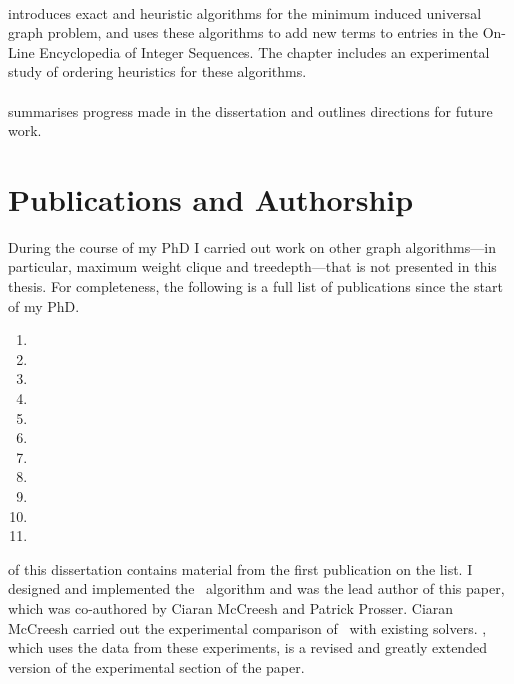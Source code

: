 \paragraph*{} introduces exact and heuristic
algorithms for the minimum induced universal graph problem, and uses these
algorithms to add new terms to entries in
the On-Line Encyclopedia of Integer Sequences.  The chapter includes
an experimental study of ordering heuristics for these algorithms.

\paragraph*{} summarises progress made in the dissertation
and outlines directions for future work.

\section{Publications and Authorship}

During the course of my PhD I carried out work on other graph algorithms---in particular,
maximum weight clique and treedepth---that is not presented in this thesis.
For completeness, the following is a full list of publications
since the start of my PhD.

\begin{enumerate}
    \item{}
    \item{}
    \item{}
    \item{}
    \item{}
    \item{}
    \item{}
    \item{}
    \item{}
    \item{}
    \item{}
\end{enumerate}

 of this dissertation contains material from the
first publication on the list.  I designed and implemented the \McSplit\
algorithm and was the lead author of this paper, which was
co-authored by Ciaran McCreesh and Patrick Prosser.
Ciaran McCreesh carried out the experimental comparison of \McSplit\ with
existing solvers.  \Cref{sec:mcsplit-experiments}, which uses the data from these
experiments, is a revised and greatly extended version of the experimental
section of the paper.

